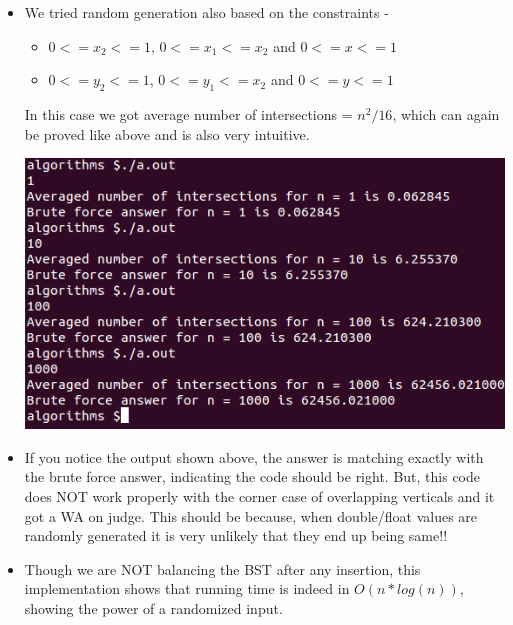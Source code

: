 \documentclass{article}
\begin{document}
\begin{itemize}
\item  We tried random generation also based on the constraints - 
\begin{itemize}
\item $0<=x_2<=1$, $0<=x_1<=x_2$ and $0<=x<=1$
\item $0<=y_2<=1$, $0<=y_1<=x_2$ and $0<=y<=1$
\end{itemize}
In this case we got average number of intersections = $n^2/16$, which can again be proved like above and is also very intuitive.
\begin{center}
\includegraphics[scale=0.5]{out.png}
\end{center}
\item If you notice the output shown above, the answer is matching exactly with the brute force answer, indicating the code should be right. But, this code does NOT work properly with the corner case of overlapping verticals and it got a WA on judge. This should be because, when double/float values are randomly generated it is very unlikely that they end up being same!!
\item Though we are NOT balancing the BST after any insertion, this implementation shows that running time is indeed in $O(n*log(n))$, showing the power of a randomized input. 
\end{itemize}
\end{document}
